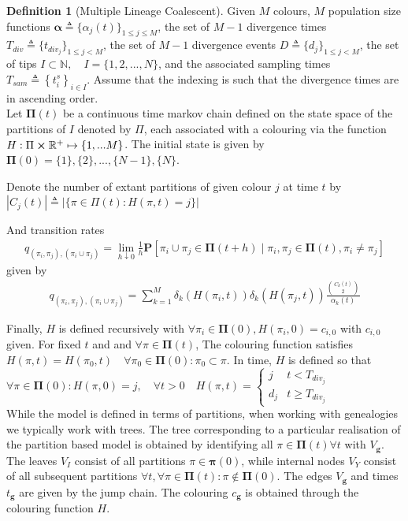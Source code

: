 \documentclass{report}
\newcommand{\R}{\mathbb{R}}
\newcommand{\N}{\mathbb{N}}
\theoremstyle{definition}
\newtheorem{definition}{Definition}[section]
\begin{document}
\begin{definition}[Multiple Lineage Coalescent]\label{def:model}
Given $M$ colours, $M$ population size functions $\mathbf{\alpha}\triangleq\{\alpha_j(t)\}_{1\leq j\leq M}$, the set of $M-1$ divergence times $T_{div} \triangleq \{t_{div_j}\}_{1\leq j<M}$, the set of $M-1$ divergence events $D \triangleq \{d_j\}_{1\leq j<M}$, the set of tips $I\subset \N, \quad I=\{1,2,...,N\}$, and the associated sampling times $T_{sam}\triangleq \left\{t^s_i\right\}_{i \in I}$.
Assume that the indexing is such that the divergence times are in ascending order.\\
Let $\pmb\Pi(t)$ be a continuous time markov chain defined on the state space of the partitions of $I$ denoted by $\Pi$, each associated with a colouring via the function $H: \Pi\cross\R^+ \mapsto \{1,...M\}$. The initial state is given by $\pmb\Pi(0) = \{1\}, \{2\}, ... , \{N-1\}, \{N\}$.

Denote the number of extant partitions of given colour $j$ at time $t$ by $|C_j(t)| \triangleq |\{\pi \in \Pi(t) : H(\pi, t) = j \}|$

And transition rates
\begin{gather}\label{eq:transitions}
q_{(\pi_i,\pi_j), (\pi_i\cup\pi_j)}=\lim\limits_{h \downarrow 0}\frac{1}{h}\mathbf{P}\left[\pi_i \cup \pi_j \in \pmb\Pi(t+h)\mid \pi_i, \pi_j \in \pmb\Pi(t), \pi_i \neq \pi_j \right]  
\end{gather}
given by
\begin{gather}\label{eq:rates}
q_{(\pi_i,\pi_j), (\pi_i\cup\pi_j)} = \sum\limits_{k=1}^{M} \delta_k(H(\pi_i,t))\delta_k(H(\pi_j,t))\frac{\binom{C_k(t)}{2}}{\alpha_k(t)}
\end{gather}
\end{definition}
Finally, $H$ is defined recursively with $\forall \pi_i \in \pmb\Pi(0), H(\pi_i,0) = c_{i,0}$ with $c_{i,0}$ given. For fixed $t$ and and $\forall \pi \in \pmb\Pi(t)$, The colouring function satisfies $H(\pi, t) = H(\pi_0,t)\quad \forall \pi_0 \in \pmb\Pi(0) : \pi_0 \subset \pi$. In time, $H$ is defined so that $\forall \pi \in \pmb\Pi(0) : H(\pi,0) = j,\quad \forall t>0 \quad H(\pi, t) = \begin{cases} 
      j & t < T_{div_j} \\
      d_j & t \geq T_{div_j}
   \end{cases}$\\
   
While the model is defined in terms of partitions, when working with genealogies we typically work with trees. The tree corresponding to a particular realisation of the partition based model is obtained by identifying all $\pi \in \pmb\Pi(t)\forall t$ with $V_\mathbf{g}$. The leaves $V_I$ consist of all partitions $\pi \in \pmb\pi(0)$, while internal nodes $V_Y$ consist of all subsequent partitions $\forall t, \forall\pi\in \pmb\Pi(t) : \pi \notin \pmb\Pi(0)$. The edges $V_\mathbf{g}$ and times $t_\mathbf{g}$ are given by the jump chain. The colouring $c_\mathbf{g}$ is obtained through the colouring function $H$. 
\end{document}
